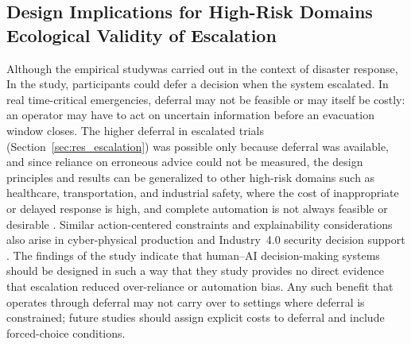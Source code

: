 \documentclass[journal]{IEEEtran}
\theoremstyle{plain}
\theoremstyle{definition}
\providecommand{\DIFaddtex}[1]{{\protect\color{blue} \sf #1}} %
\providecommand{\DIFdeltex}[1]{{\protect\color{red} \scriptsize #1}} %
\providecommand{\DIFaddbegin}{} %
\providecommand{\DIFaddend}{} %
\providecommand{\DIFdelbegin}{} %
\providecommand{\DIFdelend}{} %
\providecommand{\DIFadd}[1]{\texorpdfstring{\DIFaddtex{#1}}{#1}} %
\providecommand{\DIFdel}[1]{\texorpdfstring{\DIFdeltex{#1}}{}} %
\newcommand{\DIFscaledelfig}{0.5}
\newlength{\DIFdelgraphicswidth} %
\newlength{\DIFdelgraphicsheight} %
\newcommand{\DIFaddincludegraphics}[2][]{{\color{blue}\fbox{\DIFOincludegraphics[#1]{#2}}}} %
\newcommand{\DIFdelincludegraphics}[2][]{%
\sbox{\DIFdelgraphicsbox}{\DIFOincludegraphics[#1]{#2}}%
\settoboxwidth{\DIFdelgraphicswidth}{\DIFdelgraphicsbox} %
\settoboxtotalheight{\DIFdelgraphicsheight}{\DIFdelgraphicsbox} %
\scalebox{\DIFscaledelfig}{%
\parbox[b]{\DIFdelgraphicswidth}{\usebox{\DIFdelgraphicsbox}\\[-\baselineskip] \rule{\DIFdelgraphicswidth}{0em}}\llap{\resizebox{\DIFdelgraphicswidth}{\DIFdelgraphicsheight}{%
\setlength{\unitlength}{\DIFdelgraphicswidth}%
\begin{picture}(1,1)%
\thicklines\linethickness{2pt} %
{\color[rgb]{1,0,0}\put(0,0){\framebox(1,1){}}}%
{\color[rgb]{1,0,0}\put(0,0){\line( 1,1){1}}}%
{\color[rgb]{1,0,0}\put(0,1){\line(1,-1){1}}}%
\end{picture}%
}\hspace*{3pt}}} %
} %
\DeclareRobustCommand{\DIFaddbegin}{\DIFOaddbegin \let\includegraphics\DIFaddincludegraphics} %
\DeclareRobustCommand{\DIFaddend}{\DIFOaddend \let\includegraphics\DIFOincludegraphics} %
\DeclareRobustCommand{\DIFdelbegin}{\DIFOdelbegin \let\includegraphics\DIFdelincludegraphics} %
\DeclareRobustCommand{\DIFdelend}{\DIFOaddend \let\includegraphics\DIFOincludegraphics} %
\begin{document}
\DIFdelbegin %

\DIFdelend \subsection{\DIFdelbegin \DIFdel{Design Implications for High-Risk Domains}\DIFdelend \DIFaddbegin \DIFadd{Ecological Validity of Escalation}\DIFaddend }
\DIFdelbegin \DIFdel{Although the empirical studywas carried out in the context of disaster response, }\DIFdelend \DIFaddbegin \DIFadd{In the study, participants could defer a decision when the system escalated. In real time-critical emergencies, deferral may not be feasible or may itself be costly: an operator may have to act on uncertain information before an evacuation window closes. The higher deferral in escalated trials (Section~\ref{sec:res_escalation}) was possible only because deferral was available, and since reliance on erroneous advice could not be measured, }\DIFaddend the \DIFdelbegin \DIFdel{design principles and results can be generalized to other high-risk domains such as healthcare, transportation, and industrial safety, where the cost of inappropriate or delayed response is high, and complete automation is not always feasible or desirable \cite{PerezCerrolaza2024CSUR,Rao2024IJDRS,Rokhideh2025IJDRS,Birkmann2013NatHazards}. Similar action-centered constraints and explainability considerations also arise in cyber-physical production and Industry~4.0 security decision support \cite{Farhan2025TCE}.
The findings of the study indicate that human--AI decision-making systems should be designed in such a way that they }\DIFdelend \DIFaddbegin \DIFadd{study provides no direct evidence that escalation reduced over-reliance or automation bias. Any such benefit that operates through deferral may not carry over to settings where deferral is constrained; future studies should assign explicit costs to deferral and include forced-choice conditions.
}
\end{document}
